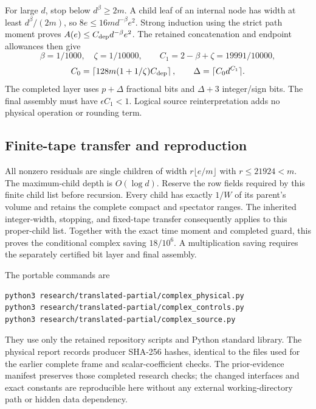 For large $d$, stop below $d^\beta\ge2m$. A child leaf of an internal
node has width at least $d^\beta/(2m)$, so $8e\le16m d^{-\beta}e^2$.
Strong induction using the strict path moment proves
$A(e)\le C_{\rm dep}d^{-\beta}e^2$. The retained concatenation and
endpoint allowances then give
\[
 \beta=1/1000,\quad\zeta=1/10000,\qquad
 C_1=2-\beta+\zeta=19991/10000,
\]
\[
 C_0=\left\lceil128m(1+1/\zeta)C_{\rm dep}\right\rceil,
 \qquad\Delta=\lceil C_0d^{C_1}\rceil.
\]
The completed layer uses $p+\Delta$ fractional bits and $\Delta+3$
integer/sign bits. The final assembly must have $\epsilon C_1<1$.
Logical source reinterpretation adds no physical operation or rounding term.

\subsection{Finite-tape transfer and reproduction}
All nonzero residuals are single children of width
$r\lfloor e/m\rfloor$ with $r\le21924<m$. The maximum-child depth is
$O(\log d)$. Reserve the row fields required by this finite child list
before recursion. Every child has exactly $1/W$ of its parent's volume
and retains the complete compact and spectator ranges. The inherited
integer-width, stopping, and fixed-tape transfer consequently applies to
this proper-child list. Together with the exact time moment and completed
guard, this proves the conditional complex saving $18/10^6$.
A multiplication saving requires the separately certified bit layer and
final assembly.

The portable commands are
\begin{verbatim}
python3 research/translated-partial/complex_physical.py
python3 research/translated-partial/complex_controls.py
python3 research/translated-partial/complex_source.py
\end{verbatim}
They use only the retained repository scripts and Python standard library.
The physical report records producer SHA-256 hashes, identical to the files
used for the earlier complete frame and scalar-coefficient checks. The
prior-evidence manifest preserves those completed research checks; the
changed interfaces and exact constants are reproducible here without any
external working-directory path or hidden data dependency.
